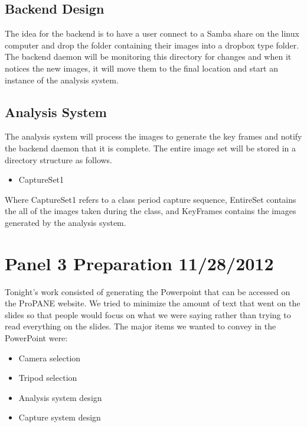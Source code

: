 \documentclass[]{article}
\begin{document}
		\subsection{Backend Design}
			The idea for the backend is to have a user connect to a Samba share on the linux computer and drop the folder containing their images into a dropbox type folder. The backend daemon will be monitoring this directory for changes and when it notices the new images, it will move them to the final location and start an instance of the analysis system.
			
		\subsection{Analysis System}
			The analysis system will process the images to generate the key frames and notify the backend daemon that it is complete. The entire image set will be stored in a directory structure as follows.
			
			\begin{itemize}
				\item CaptureSet1
			\end{itemize}
			
			Where CaptureSet1 refers to a class period capture sequence, EntireSet contains the all of the images taken during the class, and KeyFrames contains the images generated by the analysis system.
			
		
	
	\section{Panel 3 Preparation 11/28/2012}
	
		Tonight's work consisted of generating the Powerpoint that can be accessed on the ProPANE website. We tried to minimize the amount of text that went on the slides so that people would focus on what we were saying rather than trying to read everything on the slides. The major items we wanted to convey in the PowerPoint were:
		\begin{itemize}
			\item Camera selection
			\item Tripod selection
			\item Analysis system design
			\item Capture system design
		\end{itemize}
	
\end{document}
